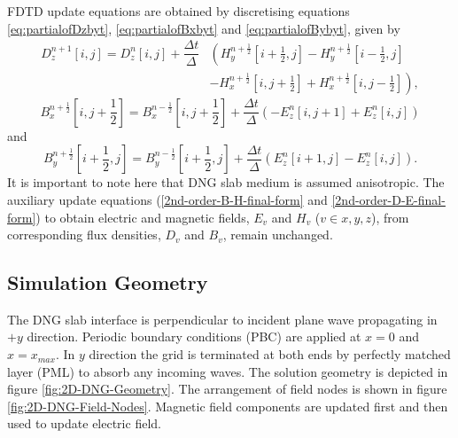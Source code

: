 FDTD update equations are obtained by discretising equations \ref{eq:partialofDzbyt}, \ref{eq:partialofBxbyt} and \ref{eq:partialofBybyt}, given by
\begin{equation}
\begin{split}
D^{n+1}_z \left[i,j\right]=D^{n}_z \left[i,j\right]+\dfrac{\Delta t}{\Delta}&\left(H^{n+\frac{1}{2}}_y\left[i+\frac{1}{2},j\right]-H^{n+\frac{1}{2}}_y \left[i-\frac{1}{2},j\right]\right.\\
&\left.-H^{n+\frac{1}{2}}_x \left[i,j+\frac{1}{2}\right]+H^{n+\frac{1}{2}}_x \left[i,j-\frac{1}{2}\right]\right),
\end{split}
\label{eq:Dz-2D-FDTD-TMz}
\end{equation}
\begin{equation}
B^{n+\frac{1}{2}}_x \left[i,j+\frac{1}{2}\right]=B^{n-\frac{1}{2}}_x \left[i,j+\frac{1}{2}\right] + \dfrac{\Delta t}{\Delta} \left(-E^{n}_z \left[i,j+1\right] + E^{n}_z \left[i,j\right] \right)
\label{eq:Bx-2D-FDTD-TMz}
\end{equation}
and
\begin{equation}
B^{n+\frac{1}{2}}_y \left[i+\frac{1}{2},j\right]=B^{n-\frac{1}{2}}_y \left[i+\frac{1}{2},j\right] + \dfrac{\Delta t}{\Delta} \left( E^{n}_z \left[i+1,j\right] - E^{n}_z \left[i,j\right] \right).
\label{eq:By-2D-FDTD-TMz}
\end{equation}
It is important to note here that DNG slab medium is assumed anisotropic. The auxiliary update equations (\ref{2nd-order-B-H-final-form} and \ref{2nd-order-D-E-final-form}) to obtain electric and magnetic fields, $E_v$ and $H_v$ ($v\in x,y,z$), from corresponding flux densities, $D_v$ and $B_v$, remain unchanged.
\subsection{Simulation Geometry}
The DNG slab interface is perpendicular to incident plane wave propagating in $+y$ direction. Periodic boundary conditions (PBC) are applied at $x=0$ and $x=x_{max}$. In $y$ direction the grid is terminated at both ends by perfectly matched layer (PML) to absorb any incoming waves. The solution geometry is depicted in figure \ref{fig:2D-DNG-Geometry}. The arrangement of field nodes is shown in figure \ref{fig:2D-DNG-Field-Nodes}.  Magnetic field components are updated first and then used to update electric field.

